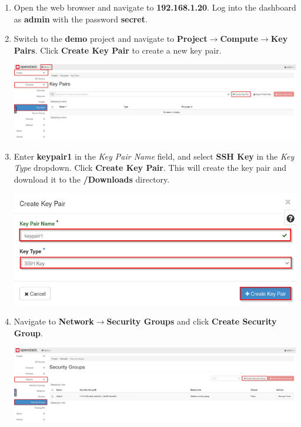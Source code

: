 \documentclass[letterpaper, 12pt]{article}
\begin{document}
\begin{enumerate}
    \item Open the web browser and navigate to \textbf{192.168.1.20}. Log into the dashboard as \textbf{admin} with the
    password \textbf{secret}.

    \item Switch to the \textbf{demo} project and navigate to \textbf{Project$\rightarrow$Compute$\rightarrow$Key
    Pairs}. Click \textbf{Create Key Pair} to create a new key pair.

    \begin{center}
        \includegraphics[width=\linewidth]{images/part4/step2.png}
    \end{center}

    \item Enter \textbf{keypair1} in the \textit{Key Pair Name} field, and select \textbf{SSH Key} in the \textit{Key
    Type} dropdown. Click \textbf{Create Key Pair}. This will create the key pair and download it to the
    \textbf{\texttildemid/Downloads} directory.

    \begin{center}
        \includegraphics[width=\linewidth]{images/part4/step3.png}
    \end{center}

    \item Navigate to \textbf{Network$\rightarrow$Security Groups} and click \textbf{Create Security Group}.

    \begin{center}
        \includegraphics[width=\linewidth]{images/part4/step4.png}
    \end{center}


\end{enumerate}
\end{document}
